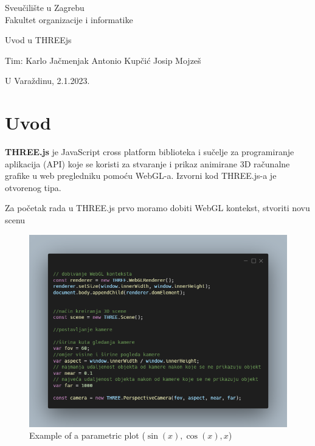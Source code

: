 \documentclass[a4paper,12pt]{article}
\begin{document}
\thispagestyle{empty}
\begin{center}
Sveučilište u Zagrebu\\
Fakultet organizacije i informatike
\end{center}
\vfill
\begin{center}
\Large Uvod u THREEjs
\end{center}
\vfill
\begin{flushright}
Tim: Karlo Jačmenjak \break
Antonio Kupčić \break
Josip Mojzeš \break
\end{flushright}
U Varaždinu, 2.1.2023. 

\newpage
\setcounter{page}{1}

\section{Uvod}
\textbf{THREE.js} je JavaScript cross platform biblioteka i sučelje za programiranje aplikacija (API) koje se koristi za stvaranje i prikaz animirane 3D računalne grafike u web pregledniku pomoću WebGL-a. Izvorni kod THREE.js-a je otvorenog tipa.

    Za početak rada u THREE.js prvo moramo dobiti WebGL kontekst, stvoriti novu scenu 


\begin{figure}[ht]
    \centering
    \includegraphics[scale=0.5]{image/zadatak1.png}
    \caption{Example of a parametric plot ($\sin (x), \cos(x), x$)}
\end{figure}
\end{document}
